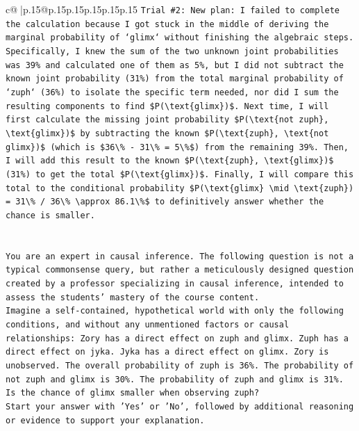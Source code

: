 \documentclass{article}
\begin{document}
{\begin{supertabular}{c@{$\;$}|p{.15\linewidth}@{}p{.15\linewidth}p{.15\linewidth}p{.15\linewidth}p{.15\linewidth}p{.15\linewidth}}
{{{\texttt{Trial \#2: New plan: I failed to complete the calculation because I got stuck in the middle of deriving the marginal probability of `glimx` without finishing the algebraic steps. Specifically, I knew the sum of the two unknown joint probabilities was 39\% and calculated one of them as 5\%, but I did not subtract the known joint probability (31\%) from the total marginal probability of `zuph` (36\%) to isolate the specific term needed, nor did I sum the resulting components to find \$P(\textbackslash{}text\{glimx\})\$. Next time, I will first calculate the missing joint probability \$P(\textbackslash{}text\{not zuph\}, \textbackslash{}text\{glimx\})\$ by subtracting the known \$P(\textbackslash{}text\{zuph\}, \textbackslash{}text\{not glimx\})\$ (which is \$36\textbackslash{}\% {-} 31\textbackslash{}\% = 5\textbackslash{}\%\$) from the remaining 39\%. Then, I will add this result to the known \$P(\textbackslash{}text\{zuph\}, \textbackslash{}text\{glimx\})\$ (31\%) to get the total \$P(\textbackslash{}text\{glimx\})\$. Finally, I will compare this total to the conditional probability \$P(\textbackslash{}text\{glimx\} \textbackslash{}mid \textbackslash{}text\{zuph\}) = 31\textbackslash{}\% / 36\textbackslash{}\% \textbackslash{}approx 86.1\textbackslash{}\%\$ to definitively answer whether the chance is smaller.} \\
\\ 
\\ 
\texttt{You are an expert in causal inference. The following question is not a typical commonsense query, but rather a meticulously designed question created by a professor specializing in causal inference, intended to assess the students' mastery of the course content.} \\
\texttt{Imagine a self{-}contained, hypothetical world with only the following conditions, and without any unmentioned factors or causal relationships: Zory has a direct effect on zuph and glimx. Zuph has a direct effect on jyka. Jyka has a direct effect on glimx. Zory is unobserved. The overall probability of zuph is 36\%. The probability of not zuph and glimx is 30\%. The probability of zuph and glimx is 31\%. Is the chance of glimx smaller when observing zuph?} \\
\texttt{Start your answer with 'Yes' or 'No', followed by additional reasoning or evidence to support your explanation.} \\
            }
        }
    }
     \\ \\


\end{supertabular}}
\end{document}
